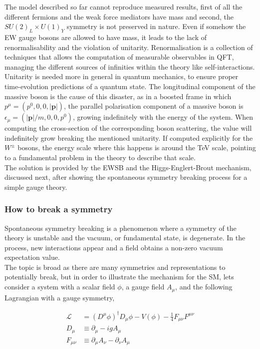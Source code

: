The model described so far cannot reproduce measured results, first of all the different fermions and the weak force mediators have mass and second, the $SU(2)_L\times U(1)_Y$ symmetry is not preserved in nature. Even if somehow the EW gauge bosons are allowed to have mass, it leads to the lack of renormalisability and the violation of unitarity.  Renormalisation is a collection of techniques that allows the computation of measurable observables in QFT, managing the different sources of infinities within the theory like self-interactions. Unitarity is needed more in general in quantum mechanics, to ensure proper time-evolution predictions of a quantum state. The longitudinal component of the massive boson is the cause of this disaster, as in a boosted frame in which $p^\mu=(p^0,0,0,|\textbf{p}|)$, the parallel polarisation component of a massive boson is $\epsilon_\mu=(|\textbf{p}|/m,0,0,p^0)$, growing indefinitely with the energy of the system. When computing the cross-section of the corresponding boson scattering, the value will indefinitely grow breaking the mentioned unitarity. If computed explicitly for the $W^\pm$ bosons, the energy scale where this happens is around the TeV scale, pointing to a fundamental problem in the theory to describe that scale.\\

The solution is provided by the EWSB and the Higgs-Englert-Brout mechanism, discussed next, after showing the spontaneous symmetry breaking process for a simple gauge theory.

\subsubsection{How to break a symmetry}

Spontaneous symmetry breaking is a phenomenon where a symmetry of the theory is unstable and the vacuum, or fundamental state, is degenerate. In the process, new interactions appear and a field obtains a non-zero vacuum expectation value.\\

The topic is broad as there are many symmetries and representations to potentially break, but in order to illustrate the mechanism for the SM, lets consider a system with a scalar field $\phi$, a gauge field $A_\mu$, and the following Lagrangian with a gauge symmetry,

\begin{equation}
    \begin{split}
    \mathcal{L}_{\ \ }&=(D^\mu\phi)^\dag D_\mu\phi - V(\phi) - \frac{1}{4}F_{\mu\nu}F^{\mu\nu}\\
    D_{\mu \ } &\equiv \partial_\mu - igA_\mu\\
    F_{\mu\nu}&\equiv\partial_\mu A_\nu - \partial_\nu A_\mu
    \end{split}
\end{equation}


